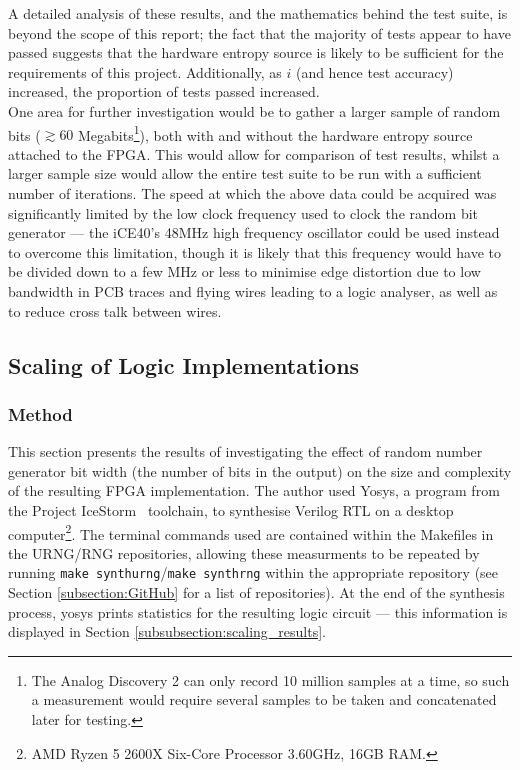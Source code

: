 \documentclass[12pt]{article}
\begin{document}
        A detailed analysis of these results, and the mathematics behind the test suite, is beyond the scope of this report; the fact that the majority of tests appear to have passed suggests that the hardware entropy source is likely to be sufficient for the requirements of this project. Additionally, as $i$ (and hence test accuracy) increased, the proportion of tests passed increased.\\

        One area for further investigation would be to gather a larger sample of random bits ($\gtrsim 60$ Megabits\footnote{The Analog Discovery 2 can only record 10 million samples at a time, so such a measurement would require several samples to be taken and concatenated later for testing.}), both with and without the hardware entropy source attached to the FPGA. This would allow for comparison of test results, whilst a larger sample size would allow the entire test suite to  be run with a sufficient number of iterations. The speed at which the above data could be acquired was significantly limited by the low clock frequency used to clock the random bit generator --- the iCE40's 48MHz high frequency oscillator could be used instead to overcome this limitation, though it is likely that this frequency would have to be divided down to a few MHz or less to minimise edge distortion due to low bandwidth in PCB traces and flying wires leading to a logic analyser, as well as to reduce cross talk between wires.


  \subsection{Scaling of Logic Implementations} \label{subsection:scaling}
    \subsubsection{Method}
      This section presents the results of investigating the effect of random number generator bit width (the number of bits in the output) on the size and complexity of the resulting FPGA implementation. The author used Yosys, a program from the Project IceStorm~\cite{icestorm} toolchain, to synthesise Verilog RTL on a desktop computer\footnote{AMD Ryzen 5 2600X Six-Core Processor 3.60GHz, 16GB RAM.}. The terminal commands used are contained within the Makefiles in the URNG/RNG repositories, allowing these measurments to be repeated by running \texttt{make synthurng}/\texttt{make synthrng} within the appropriate repository (see Section \ref{subsection:GitHub} for a list of repositories). At the end of the synthesis process, yosys prints statistics for the resulting logic circuit  --- this information is displayed in Section \ref{subsubsection:scaling_results}.
\end{document}
